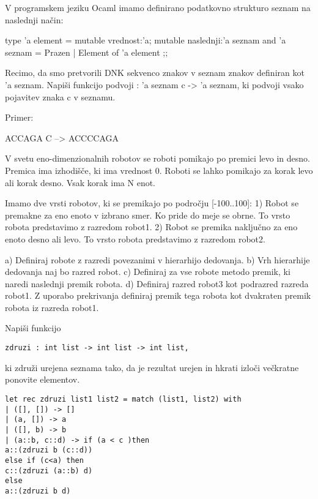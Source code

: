 \begin{ex}
\end{ex} \begin{ex}
V programskem jeziku Ocaml imamo definirano podatkovno strukturo seznam na naslednji na\v cin: 

type 'a element = { 
    mutable vrednost:'a; 
    mutable naslednji:'a seznam 
   }
and 'a seznam = Prazen | Element of 'a element ;;

Recimo, da smo pretvorili DNK sekvenco znakov v seznam znakov definiran kot           'a seznam. Napi\v si funkcijo podvoji : 'a seznam c -> 'a seznam, ki podvoji vsako pojavitev znaka c v seznamu.

Primer:

ACCAGA C --> ACCCCAGA


\end{ex} \begin{ex}
V svetu eno-dimenzionalnih robotov se roboti pomikajo po premici levo in desno. Premica ima izhodi\v s\v ce, ki ima vrednost 0. Roboti se lahko pomikajo za korak levo ali korak desno. Vsak korak ima N enot. 

Imamo dve vrsti robotov, ki se premikajo po podro\v cju [-100..100]: 
1) Robot se premakne za eno enoto v izbrano smer. Ko pride do meje se obrne. To vrsto robota predstavimo z razredom robot1.
2) Robot se premika naklju\v cno za eno enoto desno ali levo. To vrsto robota predstavimo z razredom robot2.

a) Definiraj robote z razredi povezanimi v hierarhijo dedovanja. 
b) Vrh hierarhije dedovanja naj bo razred robot. 
c) Definiraj za vse robote metodo premik, ki naredi naslednji premik robota.
d) Definiraj razred robot3 kot podrazred razreda robot1. Z uporabo prekrivanja definiraj premik tega robota kot dvakraten premik robota iz razreda robot1.




\end{ex} \begin{ex}
Napi\v si funkcijo 
\begin{verbatim}
zdruzi : int list -> int list -> int list, 
\end{verbatim}
ki zdru\v zi urejena seznama tako, da je rezultat urejen in hkrati izlo\v ci ve\v ckratne ponovite elementov.

\begin{sol}
\begin{verbatim}
let rec zdruzi list1 list2 = match (list1, list2) with
| ([], []) -> []
| (a, []) -> a
| ([], b) -> b
| (a::b, c::d) -> if (a < c )then 
a::(zdruzi b (c::d))
else if (c<a) then 
c::(zdruzi (a::b) d)
else 
a::(zdruzi b d)
\end{verbatim}
\end{sol}

\end{ex} 

